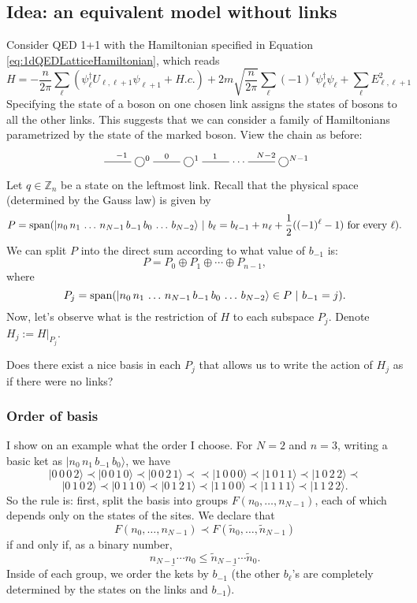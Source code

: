 	\subsection{Idea: an equivalent model without links}
	Consider QED 1+1 with the Hamiltonian specified in Equation \ref{eq:1dQEDLatticeHamiltonian}, which reads 
\[
	H=-\frac{n}{2\pi} \sum_\ell (\psi_\ell^\dagger U_{\ell,\ell+1}\psi_{\ell+1}+H.c.) + 2m\sqrt{\frac{n}{2\pi}}\sum_\ell (-1)^\ell \psi_\ell^\dagger\psi_\ell+  \sum_{\ell} E_{\ell,\ell+1}^2
\]
Specifying the state of a boson on one chosen link assigns the states of bosons to all the other links. This suggests that we can consider a family of Hamiltonians parametrized by the state of the marked boson. View the chain as before:
	\[
	\xymatrix{
	\ar@{-}[r]^{-1} & \bigcirc^0 \ar@{-}[r]^{0} &  \bigcirc^1 \ar@{-}[r]^{1} & \cdots & \ar@{-}[l]_{N-2} \bigcirc^{N-1}
	}
	\]
	Let $q \in \mathbb Z_n$ be a state on the leftmost link. Recall that the physical space (determined by the Gauss law) is given by
	\[
	P = \operatorname{span} ( |n_0\, n_1\, \ldots \, n_{N-1} \, b_{-1}\, b_0\, \ldots\, b_{N-2}\rangle \ | \ b_{\ell} =b_{\ell-1} + n_{\ell} + \frac{1}{2}((-1)^\ell-1) \ \text{for every} \ \ell).
	\]
	We can split $P$ into the direct sum according to what value of $b_{-1}$ is:
	\[
	P = P_0 \oplus P_1 \oplus \cdots \oplus P_{n-1},
	\]
	where
	\[
	P_j = \operatorname{span}( |n_0\, n_1\, \ldots \, n_{N-1} \, b_{-1}\, b_0\, \ldots\, b_{N-2}\rangle \in P \ | \ b_{-1} = j).
	\]
	Now, let's observe what is the restriction of $H$ to each subspace $P_j$. Denote $H_j := H|_{P_j}$.
\begin{idea}
Does there exist a nice basis in each $P_j$ that allows us to write the action of $H_j$ as if there were no links?
\end{idea}

\subsubsection{Order of basis}
I show on an example what the order I choose. For $N=2$ and $n=3$, writing a basic ket as $|n_0\, n_1\, b_{-1}\, b_0\rangle$, we have
\[
|0\, 0\, 0\, 2\rangle \prec |0\, 0\, 1\, 0\rangle \prec |0\, 0\, 2\, 1\rangle \prec 
\prec |1\, 0\, 0\, 0\rangle \prec |1\, 0\, 1\, 1\rangle \prec |1\, 0\, 2\, 2\rangle \prec
\]\[
 |0\, 1\, 0\, 2\rangle \prec |0\, 1\, 1\, 0\rangle \prec |0\,1\, 2\, 1\rangle \prec
|1\, 1\, 0\, 0\rangle \prec |1\, 1\, 1\, 1\rangle \prec |1\, 1\, 2\, 2\rangle.
\]
So the rule is: first, split the basis into groups $F(n_0,\ldots,n_{N-1})$, each of which depends only on the states of the sites. We declare that
\[
F(n_0,\ldots,n_{N-1}) \prec F(\tilde{n}_0,\ldots,\tilde{n}_{N-1})
\]
if and only if, as a binary number,
\[
\underline{n_{N-1}\cdots n_{0}} \leq \underline{\tilde{n}_{N-1}\cdots \tilde{n}_{0}}.
\]
Inside of each group, we order the kets by $b_{-1}$ (the other $b_{\ell}$'s are completely determined by the states on the links and $b_{-1}$).

